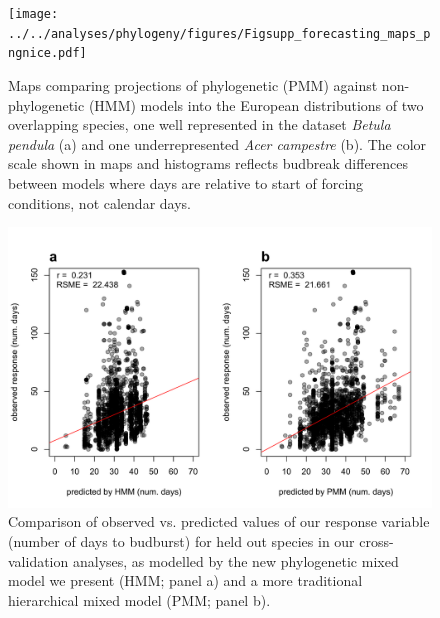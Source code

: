\documentclass[11pt]{article}
\begin{document}
\clearpage
\begin{figure}
  \begin{center}
  \texttt{[image: ../../analyses/phylogeny/figures/Figsupp\_forecasting\_maps\_pngnice.pdf]}
  \caption{Maps comparing projections of phylogenetic (PMM) against non-phylogenetic (HMM) models into the European distributions of two overlapping species, one well represented in the dataset \emph{Betula pendula} (a) and one underrepresented \emph{Acer campestre} (b). The color scale shown in maps and histograms reflects budbreak differences between models where days are relative to start of forcing conditions, not calendar days.}
  \label{fig:pmmvshmm}
  \end{center}
\end{figure}


\begin{figure}
  \begin{center}
  \includegraphics[width=16cm]{../../analyses/phylogeny/figures/FigSXXX_LOCO_observed_vs_predicted}
  \caption{Comparison of observed vs. predicted values of our response variable (number of days to budburst) for held out species in our cross-validation analyses, as modelled by the new phylogenetic mixed model we present (HMM; panel a) and a more traditional hierarchical mixed model (PMM; panel b).}
  \label{fig:LOCO_obsvspred} 
  \end{center}
\end{figure}
\end{document}
